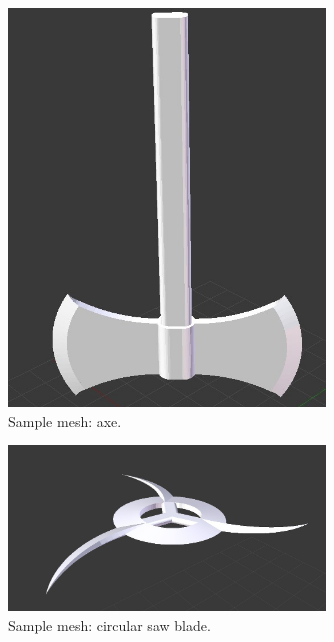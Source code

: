 \documentclass[12pt, titlepage]{article}
\begin{document}
\begin{figure}[hB]
\begin{center}
\includegraphics[width=0.75\textwidth]{axe}
\caption{Sample mesh:  axe.} \label{fig:axe}
\end{center}
\end{figure}

\begin{figure}[hB]
\begin{center}
\includegraphics[width=0.75\textwidth]{circsaw}
\caption{Sample mesh:  circular saw blade.} \label{fig:circsaw}
\end{center}
\end{figure}
\end{document}
